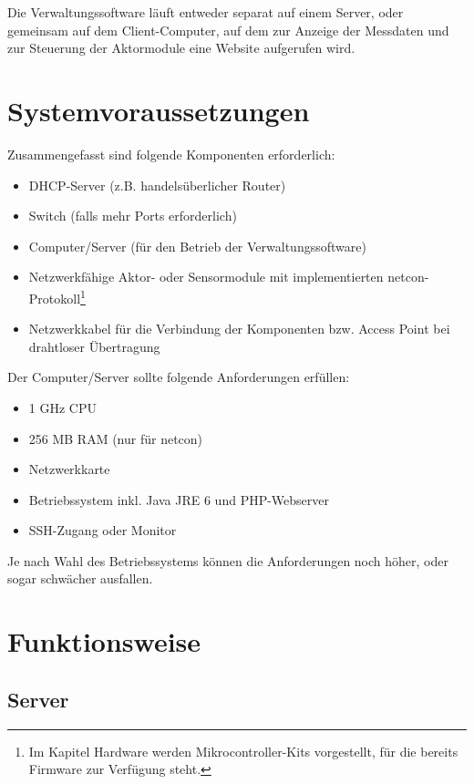 \documentclass[a4paper,14pt,headsepline]{scrartcl}
\begin{document}
Die Verwaltungssoftware läuft entweder separat auf einem Server, oder gemeinsam auf dem Client-Computer, auf dem zur Anzeige der Messdaten und zur Steuerung der Aktormodule eine Website aufgerufen wird. 

\newpage

\section{Systemvoraussetzungen}

Zusammengefasst sind folgende Komponenten erforderlich:

\begin{itemize}

\item DHCP-Server (z.B. handelsüberlicher Router)
\item Switch (falls mehr Ports erforderlich)
\item Computer/Server (für den Betrieb der Verwaltungssoftware)
\item Netzwerkfähige Aktor- oder Sensormodule mit implementierten netcon-Protokoll\footnote{Im Kapitel Hardware werden Mikrocontroller-Kits vorgestellt, für die bereits Firmware zur Verfügung steht.} 
\item Netzwerkkabel für die Verbindung der Komponenten bzw. Access Point bei drahtloser Übertragung

\end{itemize}

Der Computer/Server sollte folgende Anforderungen  erfüllen:

\begin{itemize}

\item 1 GHz CPU
\item 256 MB RAM (nur für netcon)
\item Netzwerkkarte
\item Betriebssystem inkl. Java JRE 6 und PHP-Webserver
\item SSH-Zugang oder Monitor

\end{itemize}

Je nach Wahl des Betriebssystems können die Anforderungen noch höher, oder sogar schwächer ausfallen.


\newpage
\section{Funktionsweise}

\subsection{Server}
\end{document}
